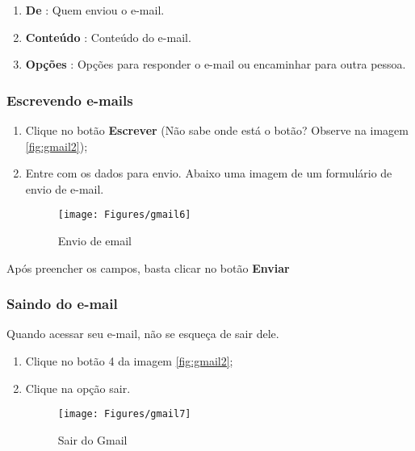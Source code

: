 \documentclass[hidelinks,12pt]{article}
\begin{document}
		\begin{enumerate}
			\item \textbf{De} : Quem enviou o e-mail.

			\item \textbf{Conteúdo} : Conteúdo do e-mail.

			\item \textbf{Opções} : Opções para responder o e-mail ou encaminhar para outra pessoa.
		\end{enumerate}

		\subsubsection{Escrevendo e-mails}

		\begin{enumerate}
			\item Clique no botão \textbf{Escrever} (Não sabe onde está o botão? Observe na imagem \ref{fig:gmail2});
			\item Entre com os dados para envio. Abaixo uma imagem de um formulário de envio de e-mail.

			\begin{figure}[!h]
				\centering
				\texttt{[image: Figures/gmail6]}
				\label{fig:gmail6}
				\caption{Envio de email}
			\end{figure}

		\end{enumerate}
		Após preencher os campos, basta clicar no botão \textbf{Enviar}
	\newpage
		\subsubsection{Saindo do e-mail}

		Quando acessar seu e-mail, não se esqueça de sair dele.

		\begin{enumerate}
			\item Clique no botão 4 da imagem \ref{fig:gmail2};

			\item Clique na opção sair.

			\begin{figure}[!h]
				\centering
				\texttt{[image: Figures/gmail7]}
				\label{fig:gmail7}
				\caption{Sair do Gmail}
			\end{figure}

		\end{enumerate}

	\newpage
	
\end{document}

